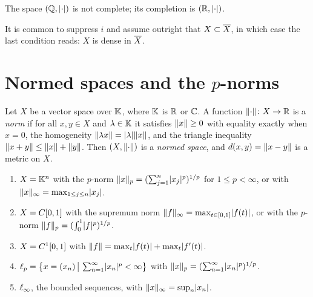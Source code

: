 \begin{example}
The space $(\Q, \abs{\cdot})$ is not complete; its completion is
$(\R, \abs{\cdot})$.
\end{example}

\begin{remark}
It is common to suppress $i$ and assume outright that $X \subset \cl{X}$, in
which case the last condition reads: $X$ is dense in $\cl{X}$.
\end{remark}

\section{Normed spaces and the \texorpdfstring{$p$}{p}-norms}

\begin{definition}[Norm]\label{def:norm}
Let $X$ be a vector space over $\K$, where $\K$ is $\R$ or $\C$. A function
$\norm{\cdot} \colon X \to \R$ is a \emph{norm} if for all $x, y \in X$ and
$\lambda \in \K$ it satisfies $\norm{x} \ge 0$ with equality exactly when
$x = 0$, the homogeneity $\norm{\lambda x} = \abs{\lambda}\norm{x}$, and the
triangle inequality $\norm{x+y} \le \norm{x} + \norm{y}$. Then
$(X, \norm{\cdot})$ is a \emph{normed space}, and $d(x,y) = \norm{x-y}$ is a
metric on $X$.
\end{definition}

\begin{example}\label{ex:spaces}
\leavevmode
\begin{enumerate}
  \item $X = \K^n$ with the $p$-norm $\norm{x}_p = (\sum_{j=1}^n
    \abs{x_j}^p)^{1/p}$ for $1 \le p < \infty$, or with
    $\norm{x}_\infty = \max_{1 \le j \le n} \abs{x_j}$.
  \item $X = \Cont{0,1}$ with the supremum norm
    $\norm{f}_\infty = \max_{t \in [0,1]} \abs{f(t)}$, or with the $p$-norm
    $\norm{f}_p = (\int_0^1 \abs{f}^p)^{1/p}$.
  \item $X = \Contk{1}{0,1}$ with
    $\norm{f} = \max_t \abs{f(t)} + \max_t \abs{f'(t)}$.
  \item $\lp{p} = \set[\big]{x = (x_n) \,\big|\, \sum_{n=1}^{\infty}
    \abs{x_n}^p < \infty}$ with
    $\norm{x}_p = (\sum_{n=1}^{\infty}\abs{x_n}^p)^{1/p}$.
  \item $\lp{\infty}$, the bounded sequences, with
    $\norm{x}_\infty = \sup_n \abs{x_n}$.
\end{enumerate}
\end{example}

